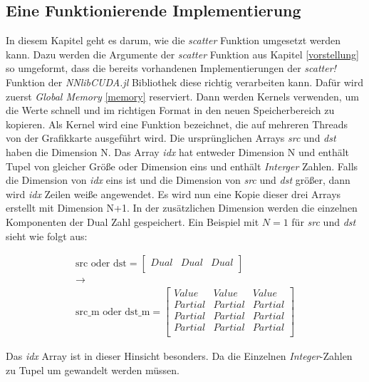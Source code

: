 \subsection{Eine Funktionierende Implementierung} \label{sec:funktional_implementaion}

In diesem Kapitel geht es darum, wie die \textit{scatter} Funktion umgesetzt werden kann.
Dazu werden die Argumente der \textit{scatter} Funktion aus Kapitel \ref{vorstellung} so
umgeformt, 
dass die bereits vorhandenen Implementierungen der \textit{scatter!} Funktion der \textit{NNlibCUDA.jl} \cite{nnlibcuda} Bibliothek 
diese richtig verarbeiten kann.
Dafür wird zuerst \textit{Global Memory} \ref{memory} reserviert. Dann werden Kernels verwenden, 
um die Werte schnell und im richtigen Format in den neuen Speicherbereich zu kopieren.
Als Kernel wird eine Funktion bezeichnet, die auf mehreren Threads von der Grafikkarte ausgeführt wird.
Die ursprünglichen Arrays \textit{src} und \textit{dst} haben die Dimension N.
Das Array \textit{idx} hat entweder Dimension N und enthält Tupel von gleicher Größe
oder Dimension eins und enthält \textit{Interger} Zahlen.
Falls die Dimension von \textit{idx} eins ist und die Dimension von \textit{src}
und \textit{dst} größer, dann wird \textit{idx} Zeilen weiße angewendet.
Es wird nun eine Kopie dieser drei Arrays erstellt mit Dimension N+1.
In der zusätzlichen Dimension werden die einzelnen Komponenten der Dual Zahl gespeichert.
Ein Beispiel mit $N = 1$ für \textit{src} und \textit{dst} sieht wie folgt aus:


\begin{gather}
\text{src oder dst} = 
\begin{bmatrix}
Dual & Dual & Dual\\
\end{bmatrix}\\
\rightarrow\\
\text{src\_m oder dst\_m} = 
\begin{bmatrix}
Value   & Value   & Value   \\
Partial & Partial & Partial \\
Partial & Partial & Partial \\
Partial & Partial & Partial \\
\end{bmatrix}
\end{gather}


Das \textit{idx} Array ist in dieser Hinsicht besonders.
Da die Einzelnen \textit{Integer}-Zahlen zu Tupel um gewandelt werden müssen.

